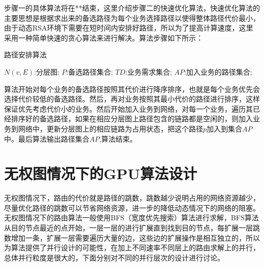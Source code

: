  步骤一的具体算法将在**结束，这里介绍步骤二的快速优化算法，快速优化算法的主要思想是根据求出来的备选路径为每个业务选择路径以使得整体路径代价最小，由于动态RSA环境下需要在短时间内安排好路径，所以为了提高计算速度，这里采用一种简单快速的贪心算法来进行解决。算法步骤如下所示：
\begin{algorithm}[htb] 
\caption{路径安排算法} 
\label{arrange} 
\begin{algorithmic}[1] 
\Require 
$N(v,E)$:分层图;
$P$:备选路径集合;
$TD$:业务需求集合;
\Ensure 
$AP$:加入业务的路径集合; 
\EndFor
{}
\EndIf
\EndFor
\EndFor
\end{algorithmic} 
\end{algorithm}
 算法开始对每个业务的备选路径按照其代价进行降序排序，也就是每个业务优先会选择代价较低的备选路径。然后，再对业务按照其最小代价的路径进行排序，这样保证优先考虑代价小的业务。然后开始加入业务到网络，对每一个业务，遍历其已经排序好的备选路径，如果在相应分层图上路径包含的链路都是空闲的，则加入业务到网络中，更新分层图上的相应链路为占用状态，把这个路径$p$加入到集合$AP$中。最后算法输出路径集合$AP$,算法结束。
\section{无权图情况下的GPU算法设计}
  无权图情况下，路由的代价就是路径的跳数，跳数越少说明占用的网络资源越少，尽量优化路径的跳数可以节省网络资源，进一步的降低动态情况下的网络的阻塞。无权图情况下的路由算法一般使用BFS（宽度优先搜索）算法进行求解，BFS算法从目的节点最近的点开始，一层一层的进行扩展直到找到目的节点，每扩展一层跳数增加一条，扩展一层需要遍历大量的边，这些边的扩展操作是相互独立的，所以为算法提供了并行设计的可能性，在加上不同速率不同层上的路由求解上的并行，总体并行粒度是很大的，下面分别对不同的并行层次的设计进行讨论。
